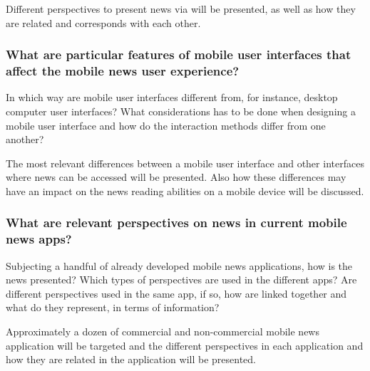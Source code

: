 Different perspectives to present news via will be presented, as well as how they are related and corresponds with each other. 



\subsubsection{What are particular features of mobile user interfaces that affect the mobile news user experience?}

In which way are mobile user interfaces different from, for instance, desktop computer user interfaces? What considerations has to be done when designing a mobile user interface and how do the interaction methods differ from one another?

The most relevant differences between a mobile user interface and other interfaces where news can be accessed will be presented. Also how these differences may have an impact on the news reading abilities on a mobile device will be discussed.




\subsubsection{What are relevant perspectives on news in current mobile news apps?}

Subjecting a handful of already developed mobile news applications, how is the news presented? Which types of perspectives are used in the different apps? Are different perspectives used in the same app, if so, how are linked together and what do they represent, in terms of information?

Approximately a dozen of commercial and non-commercial mobile news application will be targeted and the different perspectives in each application and how they are related in the application will be presented.

